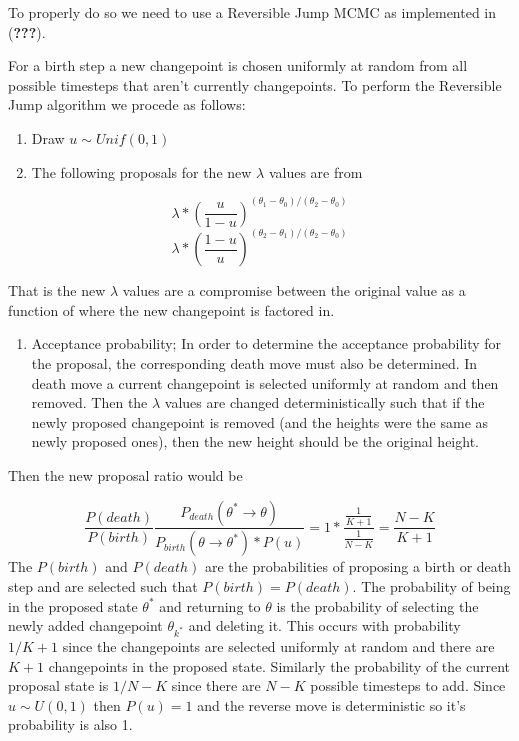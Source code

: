 \documentclass[]{article}
\providecommand{\tightlist}{%
  \setlength{\itemsep}{0pt}\setlength{\parskip}{0pt}}
\numberwithin{equation}{section}
\begin{document}
To properly do so we need to use a Reversible Jump MCMC as implemented
in ({\textbf{???}}).

For a birth step a new changepoint is chosen uniformly at random from
all possible timesteps that aren't currently changepoints. To perform
the Reversible Jump algorithm we procede as follows:

\begin{enumerate}
\def\labelenumi{\arabic{enumi}.}
\tightlist
\item
  Draw \(u \sim Unif(0,1)\)
\item
  The following proposals for the new \(\lambda\) values are from
\end{enumerate}

\[\lambda*(\frac{u}{1-u})^{(\theta_1-\theta_0)/(\theta_2-\theta_0)}\]
\[\lambda*(\frac{1-u}{u})^{(\theta_2-\theta_1)/(\theta_2-\theta_0)}\]

That is the new \(\lambda\) values are a compromise between the original
value as a function of where the new changepoint is factored in.

\begin{enumerate}
\def\labelenumi{\arabic{enumi}.}
\setcounter{enumi}{2}
\tightlist
\item
  Acceptance probability; In order to determine the acceptance
  probability for the proposal, the corresponding death move must also
  be determined. In death move a current changepoint is selected
  uniformly at random and then removed. Then the \(\lambda\) values are
  changed deterministically such that if the newly proposed changepoint
  is removed (and the heights were the same as newly proposed ones),
  then the new height should be the original height.
\end{enumerate}

Then the new proposal ratio would be

\[ \frac{P(death)}{P(birth)}\frac{P_{death}(\theta^*\rightarrow\theta)}{P_{birth}(\theta\rightarrow \theta^*)*P(u)} = 1*\frac{\frac{1}{K+1}}{\frac{1}{N-K}} = \frac{N-K}{K+1} \]
The \(P(birth)\) and \(P(death)\) are the probabilities of proposing a
birth or death step and are selected such that \(P(birth) = P(death)\).
The probability of being in the proposed state \(\theta^*\) and
returning to \(\theta\) is the probability of selecting the newly added
changepoint \(\theta_{k^*}\) and deleting it. This occurs with
probability \(1/K+1\) since the changepoints are selected uniformly at
random and there are \(K+1\) changepoints in the proposed state.
Similarly the probability of the current proposal state is \(1/N-K\)
since there are \(N-K\) possible timesteps to add. Since
\(u \sim U(0,1)\) then \(P(u) = 1\) and the reverse move is
deterministic so it's probability is also 1.
\end{document}
